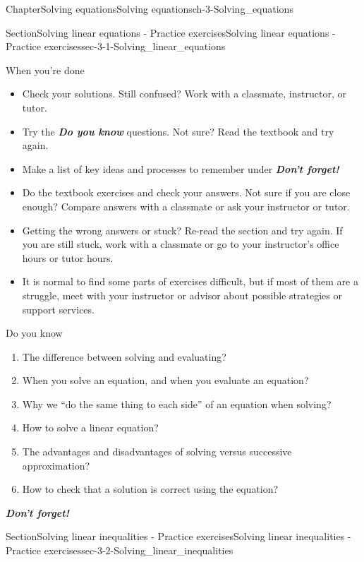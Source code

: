 \documentclass[twoside,11pt,]{book}
\newcommand{\alert}[1]{\textbf{\textit{#1}}}
\numberwithin{equation}{section}
\begin{document}
\begin{chapterptx}{Chapter}{Solving equations}{}{Solving equations}{}{}{ch-3-Solving_equations}
\begin{sectionptx}{Section}{Solving linear equations - Practice exercises}{}{Solving linear equations - Practice exercises}{}{}{sec-3-1-Solving_linear_equations}
\begin{conclusion}{When you're done \textellipsis{}}
%
\begin{itemize}[label=\textbullet]
\item{}Check your solutions. Still confused? Work with a classmate, instructor, or tutor.%
\item{}Try the \alert{Do you know} questions. Not sure? Read the textbook and try again.%
\item{}Make a list of key ideas and processes to remember under \alert{Don't forget!}%
\item{}Do the textbook exercises and check your answers. Not sure if you are close enough? Compare answers with a classmate or ask your instructor or tutor.%
\item{}Getting the wrong answers or stuck? Re-read the section and try again. If you are still stuck, work with a classmate or go to your instructor's office hours or tutor hours.%
\item{}It is normal to find some parts of exercises difficult, but if most of them are a struggle, meet with your instructor or advisor about possible strategies or support services.%
\end{itemize}
%
\end{conclusion}%
\begin{conclusion}{Do you know \textellipsis{}}%
%
\begin{enumerate}[label={\Alph*.}]
\item{}The difference between solving and evaluating?%
\item{}When you solve an equation, and when you evaluate an equation?%
\item{}Why we ``do the same thing to each side'' of an equation when solving?%
\item{}How to solve a linear equation?%
\item{}The advantages and disadvantages of solving versus successive approximation?%
\item{}How to check that a solution is correct using the equation?%
\end{enumerate}
%
\par
\alert{Don't forget!}%
\end{conclusion}%
\end{sectionptx}
%
%
\typeout{************************************************}
\typeout{************************************************}
%
\begin{sectionptx}{Section}{Solving linear inequalities - Practice exercises}{}{Solving linear inequalities - Practice exercises}{}{}{sec-3-2-Solving_linear_inequalities}

\end{sectionptx}
\end{chapterptx}
\end{document}
